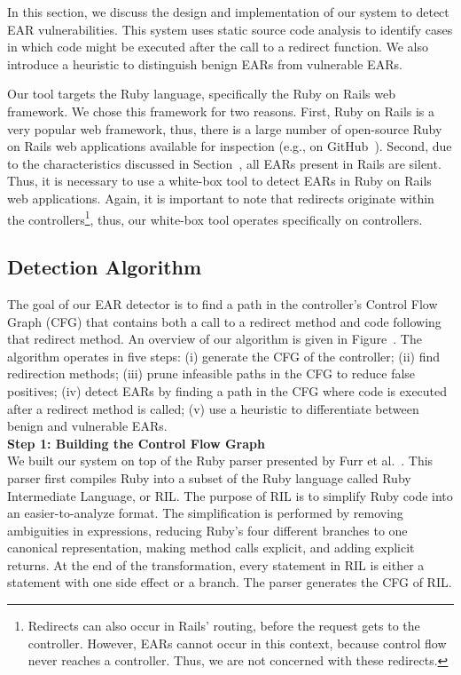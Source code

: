 In this section, we discuss the design and implementation of our system
to detect EAR vulnerabilities. This system uses static source code
analysis to identify cases in which code might be executed after the
call to a redirect function. We also introduce a heuristic to
distinguish benign EARs from vulnerable EARs.

Our tool targets the Ruby language, specifically the Ruby on Rails web
framework. We chose this framework for two reasons. First, Ruby on Rails is
a very popular web framework, thus, there is a large number of open-source
Ruby on Rails web applications available for inspection (e.g., on
GitHub~\cite{github}). Second, due to the characteristics discussed in
Section~, all EARs present in Rails are silent. Thus, it is
necessary to use a white-box tool to detect EARs in Ruby on Rails web
applications. Again, it is important to note that redirects originate
within the controllers\footnote{Redirects can also occur in Rails' routing,
  before the request gets to the controller. However, EARs cannot occur in
  this context, because control flow never reaches a controller. Thus, we
  are not concerned with these redirects.}, thus, our white-box tool
operates specifically on controllers.

\subsection{Detection Algorithm}



The goal of our EAR detector is to find a path in the controller's
Control Flow Graph (CFG) that contains both a call to a redirect
method and code following that redirect method. An overview of our
algorithm is given in Figure~. The algorithm
operates in five steps: (i) generate the CFG of the controller; (ii)
find redirection methods; (iii) prune
infeasible paths in the CFG to reduce false positives; (iv) detect
EARs by finding a path in the CFG where code is executed after a
redirect method is called; (v) use a heuristic to differentiate
between benign and vulnerable EARs.
\\

\noindent\textbf{Step 1: Building the Control Flow Graph}\\
We built our system on top of the Ruby parser presented by Furr et
al.~\cite{furr09:ril}. This parser first compiles Ruby into a subset
of the Ruby language called Ruby Intermediate Language, or RIL. The
purpose of RIL is to simplify Ruby code into an easier-to-analyze
format. The simplification is performed by removing ambiguities in
expressions, reducing Ruby's four different branches to one canonical
representation, making method calls explicit, and adding explicit
returns. At the end of the transformation, every statement in RIL is
either a statement with one side effect or a branch. The parser generates the CFG of RIL.

